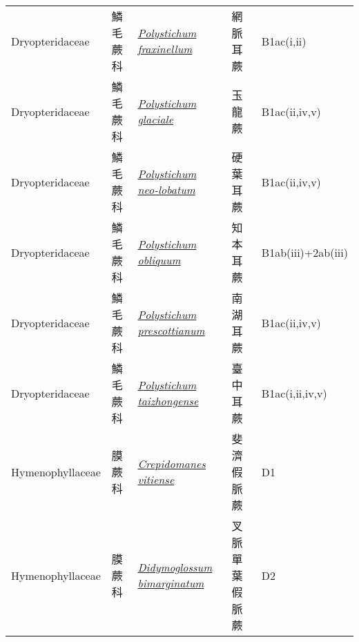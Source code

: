 {\begin{longtable}{L{2.5cm}L{2cm}L{5cm}L{2.5cm}L{3cm}}
    Dryopteridaceae & 鱗毛蕨科 & \href{http://www.theplantlist.org/tpl1.1/search?q=Polystichum+fraxinellum}{\textit{Polystichum fraxinellum} } & 網脈耳蕨 & B1ac(i,ii)    \\
    Dryopteridaceae & 鱗毛蕨科 & \href{http://www.theplantlist.org/tpl1.1/search?q=Polystichum+glaciale}{\textit{Polystichum glaciale} } & 玉龍蕨 & B1ac(ii,iv,v)    \\
    Dryopteridaceae & 鱗毛蕨科 & \href{http://www.theplantlist.org/tpl1.1/search?q=Polystichum+neo-lobatum}{\textit{Polystichum neo-lobatum} } & 硬葉耳蕨 & B1ac(ii,iv,v)    \\
    Dryopteridaceae & 鱗毛蕨科 & \href{http://www.theplantlist.org/tpl1.1/search?q=Polystichum+obliquum}{\textit{Polystichum obliquum} } & 知本耳蕨 & B1ab(iii)+2ab(iii)    \\
    Dryopteridaceae & 鱗毛蕨科 & \href{http://www.theplantlist.org/tpl1.1/search?q=Polystichum+prescottianum}{\textit{Polystichum prescottianum} } & 南湖耳蕨 & B1ac(ii,iv,v)    \\
    Dryopteridaceae & 鱗毛蕨科 & \href{http://www.theplantlist.org/tpl1.1/search?q=Polystichum+taizhongense}{\textit{Polystichum taizhongense} } & 臺中耳蕨 & B1ac(i,ii,iv,v)    \\
    Hymenophyllaceae & 膜蕨科 & \href{http://www.theplantlist.org/tpl1.1/search?q=Crepidomanes+vitiense}{\textit{Crepidomanes vitiense} } & 斐濟假脈蕨 & D1    \\
    Hymenophyllaceae & 膜蕨科 & \href{http://www.theplantlist.org/tpl1.1/search?q=Didymoglossum+bimarginatum}{\textit{Didymoglossum bimarginatum} } & 叉脈單葉假脈蕨 & D2    \\

\end{longtable}}
